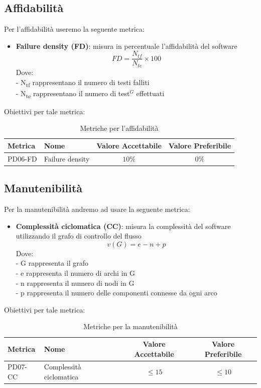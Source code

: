 \documentclass[a4paper,10pt]{article}
\begin{document}
\subsection{Affidabilità}
Per l'affidabilità useremo la seguente metrica:
\begin{itemize}
    \item \textbf{Failure density (FD)}: misura in percentuale l'affidabilità del software
    \[
    FD = \frac{N_{tf}}{N_{te}} \times 100
    \]
    Dove: \\
    - N\textsubscript{tf} rappresentano il numero di testi falliti \\
    - N\textsubscript{te} rappresentano il numero di test$^G$ effettuati 
\end{itemize}
Obiettivi per tale metrica:
\begin{table}[H]
\centering
\renewcommand{\arraystretch}{1.2}
\begin{tabular}{|l|l|c|c|}
\hline
\textbf{Metrica} & \textbf{Nome} & \textbf{Valore Accettabile} & \textbf{Valore Preferibile} \\
\hline
PD06-FD & Failure density & $10\%$ & $0\%$ \\
\hline
\end{tabular}
\caption{Metriche per l'affidabilità}
\label{tab:metriche-affidabilità}
\end{table}
\subsection{Manutenibilità}
Per la manutenibilità andremo ad usare la seguente metrica:
\begin{itemize}
    \item \textbf{Complessità ciclomatica (CC)}: misura la complessità del software utilizzando il grafo di controllo del flusso
    \[
    v(G) = e - n + p
    \]
    Dove: \\
    - G rappresenta il grafo \\
    - e rappresenta il numero di archi in G \\
    - n rappresenta il numero di nodi in G \\
    - p rappresenta il numero delle componenti connesse da ogni arco 
\end{itemize}
Obiettivi per tale metrica:
\begin{table}[H]
\centering
\renewcommand{\arraystretch}{1.2}
\begin{tabular}{|l|l|c|c|}
\hline
\textbf{Metrica} & \textbf{Nome} & \textbf{Valore Accettabile} & \textbf{Valore Preferibile} \\
\hline
PD07-CC & Complessità ciclomatica & $\leq 15$ & $\leq 10$ \\
\hline
\end{tabular}
\caption{Metriche per la manutenibilità}
\label{tab:metriche-manutenibilità}
\end{table}
\end{document}
